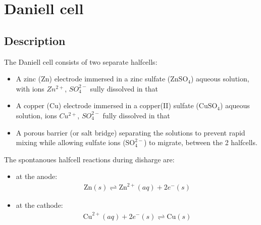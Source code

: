 \documentclass[letterpaper,10pt,english]{jupyterBook}
\begin{document}
\sphinxstepscope


\section{Daniell cell}
\label{\detokenize{ch/batteries-daniell:daniell-cell}}\label{\detokenize{ch/batteries-daniell:electro-chemical-batteries-daniell}}\label{\detokenize{ch/batteries-daniell::doc}}

\subsection{Description}
\label{\detokenize{ch/batteries-daniell:description}}\label{\detokenize{ch/batteries-daniell:electro-chemical-batteries-daniell-description}}
\sphinxAtStartPar
The Daniell cell consists of two separate half\sphinxhyphen{}cells:
\begin{itemize}
\item {} 
\sphinxAtStartPar
A zinc (\(\text{Zn}\)) electrode immersed in a zinc sulfate (\(\text{ZnSO}_4\)) aqueous solution, with ions \(Zn^{2+}\), \(SO_4^{2-}\) sully dissolved in that

\item {} 
\sphinxAtStartPar
A copper (\(\text{Cu}\)) electrode immersed in a copper(II) sulfate (\(\text{CuSO}_4\)) aqueous solution, ions \(Cu^{2+}\), \(SO_4^{2-}\) fully dissolved in that

\item {} 
\sphinxAtStartPar
A porous barrier (or salt bridge) separating the solutions to prevent rapid mixing while allowing sulfate ions (\(\text{SO}_4^{2-}\)) to migrate, between the 2 half\sphinxhyphen{}cells.

\end{itemize}

\sphinxAtStartPar
The spontanoues half\sphinxhyphen{}cell reactions during disharge are:
\begin{itemize}
\item {} 
\sphinxAtStartPar
at the anode:
\begin{equation}\label{equation:ch/batteries-daniell:eq:daniell:reaction:anode}
\begin{split}\text{Zn}(s) \rightleftharpoons \text{Zn}^{2+}(aq) + 2 e^-(s)\end{split}
\end{equation}
\item {} 
\sphinxAtStartPar
at the cathode:
\begin{equation}\label{equation:ch/batteries-daniell:eq:daniell:reaction:cathode}
\begin{split}\text{Cu}^{2+}(aq) + 2 e^-(s) \rightleftharpoons \text{Cu}(s)\end{split}
\end{equation}
\end{itemize}
\end{document}
